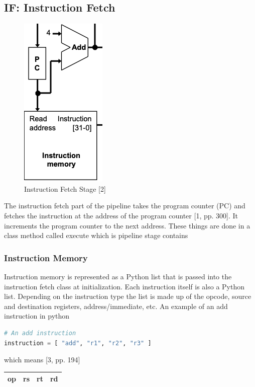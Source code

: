 \documentclass[conference]{IEEEtran}
\begin{document}
\subsection{IF: Instruction Fetch}

\begin{figure}
    \centering
    \includegraphics[scale=.4]{instructionfetch.png}
    \caption{Instruction Fetch Stage [2]}
    \label{fig:instructionfetch}
\end{figure}

The instruction fetch part of the pipeline takes the program counter (PC) and fetches the instruction at the address of the program counter [1, pp. 300].  It increments the program counter to the next address.  These things are done in a class method called execute which is pipeline stage contains

\subsubsection{Instruction Memory}

Instruction memory is represented as a Python list that is passed into the instruction fetch class at initialization.  Each instruction itself is also a Python list.  Depending on the instruction type the list is made up of the opcode, source and destination registers, address/immediate, etc.  An example of an add instruction in python 

\begin{lstlisting}[language=Python]
# An add instruction
instruction = [ "add", "r1", "r2", "r3" ]
\end{lstlisting}

which means [3, pp. 194]

\begin{center}
\begin{tabular}{|c|c|c|c|}
\hline
     op & rs & rt & rd \\
\hline
\end{tabular}
\end{center}
\end{document}
